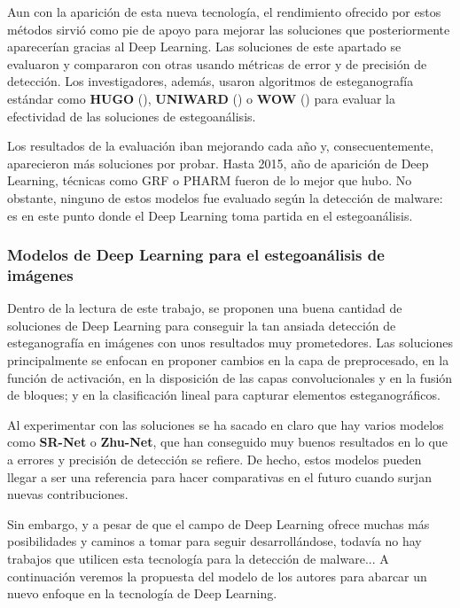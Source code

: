 Aun con la aparición de esta nueva tecnología, el rendimiento ofrecido por estos métodos sirvió como pie de apoyo para mejorar las soluciones que posteriormente aparecerían gracias al Deep Learning. Las soluciones de este apartado se evaluaron y compararon con otras usando métricas de error y de precisión de detección. Los investigadores, además, usaron algoritmos de esteganografía estándar como \textbf{HUGO} (\cite{hugo}), \textbf{UNIWARD} (\cite{uniward}) o \textbf{WOW} (\cite{wow}) para evaluar la efectividad de las soluciones de estegoanálisis.%

Los resultados de la evaluación iban mejorando cada año y, consecuentemente, aparecieron más soluciones por probar. Hasta 2015, año de aparición de Deep Learning, técnicas como GRF o PHARM fueron de lo mejor que hubo. No obstante, ninguno de estos modelos fue evaluado según la detección de malware: es en este punto donde el Deep Learning toma partida en el estegoanálisis.

\subsubsection{Modelos de Deep Learning para el estegoanálisis de imágenes}

Dentro de la lectura de este trabajo, se proponen una buena cantidad de soluciones de Deep Learning para conseguir la tan ansiada detección de esteganografía en imágenes con unos resultados muy prometedores. Las soluciones principalmente se enfocan en proponer cambios en la capa de preprocesado, en la función de activación, en la disposición de las capas convolucionales y en la fusión de bloques; y en la clasificación lineal para capturar elementos esteganográficos.

Al experimentar con las soluciones se ha sacado en claro que hay varios modelos como \textbf{SR-Net} o \textbf{Zhu-Net}, que han conseguido muy buenos resultados en lo que a errores y precisión de detección se refiere. De hecho, estos modelos pueden llegar a ser una referencia para hacer comparativas en el futuro cuando surjan nuevas contribuciones.

Sin embargo, y a pesar de que el campo de Deep Learning ofrece muchas más posibilidades y caminos a tomar para seguir desarrollándose, todavía no hay trabajos que utilicen esta tecnología para la detección de malware... A continuación veremos la propuesta del modelo de los autores para abarcar un nuevo enfoque en la tecnología de Deep Learning.

